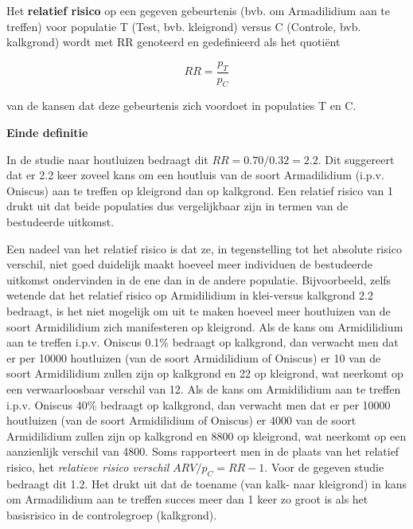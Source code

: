 \documentclass[12pt,dutch,coursenotes]{book}
\theoremstyle{definition}
\theoremstyle{definition}
\theoremstyle{definition}
\theoremstyle{remark}
\let\BeginKnitrBlock\begin \let\EndKnitrBlock\end
\begin{document}
\BeginKnitrBlock{definition}[relatief risico]
\protect\hypertarget{def:unnamed-chunk-57}{}{\label{def:unnamed-chunk-57}
\iffalse (relatief risico) \fi{} }Het \textbf{relatief risico} op een
gegeven gebeurtenis (bvb. om Armadilidium aan te treffen) voor populatie
T (Test, bvb. kleigrond) versus C (Controle, bvb. kalkgrond) wordt met
RR genoteerd en gedefinieerd als het quotiënt

\begin{equation*}
RR=\frac{p_T}{p_C}
\end{equation*}

van de kansen dat deze gebeurtenis zich voordoet in populaties T en C.

\textbf{Einde definitie}
\EndKnitrBlock{definition}

In de studie naar houtluizen bedraagt dit \(RR=0.70/0.32=2.2\). Dit
suggereert dat er 2.2 keer zoveel kans om een houtluis van de soort
Armadilidium (i.p.v. Oniscus) aan te treffen op kleigrond dan op
kalkgrond. Een relatief risico van 1 drukt uit dat beide populaties dus
vergelijkbaar zijn in termen van de bestudeerde uitkomst.

Een nadeel van het relatief risico is dat ze, in tegenstelling tot het
absolute risico verschil, niet goed duidelijk maakt hoeveel meer
individuen de bestudeerde uitkomst ondervinden in de ene dan in de
andere populatie. Bijvoorbeeld, zelfs wetende dat het relatief risico op
Armidilidium in klei-versus kalkgrond 2.2 bedraagt, is het niet mogelijk
om uit te maken hoeveel meer houtluizen van de soort Armidilidium zich
manifesteren op kleigrond. Als de kans om Armidilidium aan te treffen
i.p.v. Oniscus 0.1\% bedraagt op kalkgrond, dan verwacht men dat er per
10000 houtluizen (van de soort Armidilidium of Oniscus) er 10 van de
soort Armidilidium zullen zijn op kalkgrond en 22 op kleigrond, wat
neerkomt op een verwaarloosbaar verschil van 12. Als de kans om
Armidilidium aan te treffen i.p.v. Oniscus 40\% bedraagt op kalkgrond,
dan verwacht men dat er per 10000 houtluizen (van de soort Armidilidium
of Oniscus) er 4000 van de soort Armidilidium zullen zijn op kalkgrond
en 8800 op kleigrond, wat neerkomt op een aanzienlijk verschil van 4800.
Soms rapporteert men in de plaats van het relatief risico, het
\emph{relatieve risico verschil} \(ARV/p_C=RR-1\). Voor de gegeven
studie bedraagt dit 1.2. Het drukt uit dat de toename (van kalk- naar
kleigrond) in kans om Armadilidium aan te treffen succes meer dan 1 keer
zo groot is als het basisrisico in de controlegroep (kalkgrond).
\end{document}
